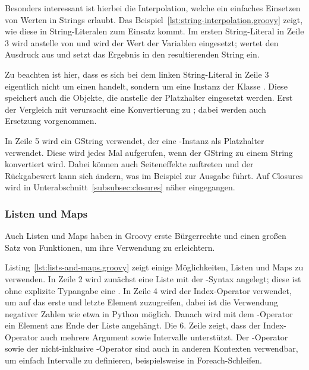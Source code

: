 	Besonders interessant ist hierbei die Interpolation, welche ein einfaches Einsetzen von Werten in Strings erlaubt.
	Das Beispiel~\ref{lst:string-interpolation.groovy} zeigt, wie diese in String-Literalen zum Einsatz kommt.
	Im ersten String-Literal in Zeile 3 wird anstelle von  und  wird der Wert der Variablen eingesetzt;
	 wertet den Ausdruck  aus und setzt das Ergebnis in den resultierenden String ein.

	Zu beachten ist hier, dass es sich bei dem linken String-Literal in Zeile 3 eigentlich nicht um einen  handelt, sondern um eine Instanz der Klasse .
	Diese speichert auch die Objekte, die anstelle der Platzhalter eingesetzt werden.
	Erst der Vergleich mit \code{==} verursacht eine Konvertierung zu ; dabei werden auch Ersetzung vorgenommen.

	In Zeile 5 wird ein GString verwendet, der eine -Instanz als Platzhalter verwendet.
	Diese wird jedes Mal aufgerufen, wenn der GString zu einem String konvertiert wird.
	Dabei können auch Seiteneffekte auftreten und der Rückgabewert kann sich ändern, was im Beispiel zur Ausgabe  führt.
	Auf Closures wird in Unterabschnitt~\ref{subsubsec:closures} näher eingegangen.

	\subsubsection{Listen und Maps}

	Auch Listen und Maps haben in Groovy erste Bürgerrechte und einen großen Satz von Funktionen, um ihre Verwendung zu erleichtern.


	Listing~\ref{lst:lists-and-maps.groovy} zeigt einige Möglichkeiten, Listen und Maps zu verwenden.
	In Zeile 2 wird zunächst eine Liste mit der \code{[]}-Syntax angelegt;
	diese ist ohne explizite Typangabe eine .
	In Zeile 4 wird der Index-Operator verwendet, um auf das erste und letzte Element zuzugreifen, dabei ist die Verwendung negativer Zahlen wie etwa in Python möglich.
	Danach wird mit dem \code{<<}-Operator ein Element ans Ende der Liste angehängt.
	Die 6. Zeile zeigt, dass der Index-Operator auch mehrere Argument sowie Intervalle unterstützt.
	Der -Operator sowie der nicht-inklusive -Operator sind auch in anderen Kontexten verwendbar, um einfach Intervalle zu definieren, beispielsweise in Foreach-Schleifen.

